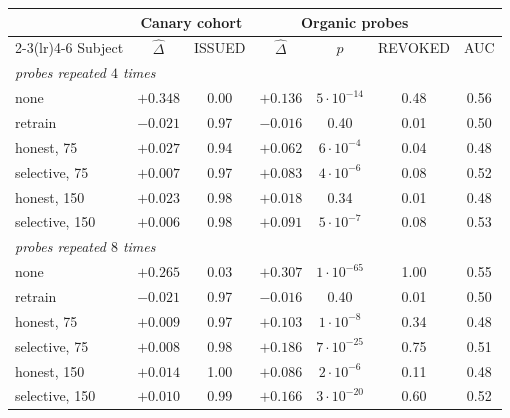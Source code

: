 \begin{tabular}{lcccccc}
\toprule
 & \multicolumn{2}{c}{Canary cohort} & \multicolumn{3}{c}{Organic probes} & \\
\cmidrule(lr){2-3}\cmidrule(lr){4-6}
Subject & $\hat\Delta$ & ISSUED & $\hat\Delta$ & $p$ & REVOKED & AUC \\
\midrule
\multicolumn{7}{l}{\emph{probes repeated $4$ times}} \\
none & $+0.348$ & 0.00 & $+0.136$ & $5\cdot10^{-14}$ & 0.48 & 0.56 \\
retrain & $-0.021$ & 0.97 & $-0.016$ & 0.40 & 0.01 & 0.50 \\
honest, 75 & $+0.027$ & 0.94 & $+0.062$ & $6\cdot10^{-4}$ & 0.04 & 0.48 \\
selective, 75 & $+0.007$ & 0.97 & $+0.083$ & $4\cdot10^{-6}$ & 0.08 & 0.52 \\
honest, 150 & $+0.023$ & 0.98 & $+0.018$ & 0.34 & 0.01 & 0.48 \\
selective, 150 & $+0.006$ & 0.98 & $+0.091$ & $5\cdot10^{-7}$ & 0.08 & 0.53 \\
\midrule
\multicolumn{7}{l}{\emph{probes repeated $8$ times}} \\
none & $+0.265$ & 0.03 & $+0.307$ & $1\cdot10^{-65}$ & 1.00 & 0.55 \\
retrain & $-0.021$ & 0.97 & $-0.016$ & 0.40 & 0.01 & 0.50 \\
honest, 75 & $+0.009$ & 0.97 & $+0.103$ & $1\cdot10^{-8}$ & 0.34 & 0.48 \\
selective, 75 & $+0.008$ & 0.98 & $+0.186$ & $7\cdot10^{-25}$ & 0.75 & 0.51 \\
honest, 150 & $+0.014$ & 1.00 & $+0.086$ & $2\cdot10^{-6}$ & 0.11 & 0.48 \\
selective, 150 & $+0.010$ & 0.99 & $+0.166$ & $3\cdot10^{-20}$ & 0.60 & 0.52 \\
\bottomrule
\end{tabular}
